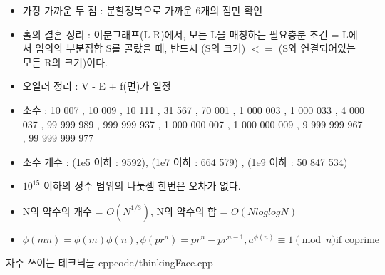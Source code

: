 \documentclass[landscape, 10pt, a4paper, oneside, twocolumn]{extarticle}
\begin{document}
\begin{itemize}
\item 가장 가까운 두 점 : 분할정복으로 가까운 6개의 점만 확인

\item 홀의 결혼 정리 : 이분그래프(L-R)에서, 모든 L을 매칭하는 필요충분 조건 = L에서 임의의 부분집합 S를 골랐을 때, 반드시 (S의 크기) $<=$ (S와 연결되어있는 모든 R의 크기)이다.

\item 오일러 정리 : V - E + f(면)가 일정

\item 소수 : 10 007 , 10 009 , 10 111 , 31 567 , 70 001 , 1 000 003 , 1 000 033 , 4 000 037 , 99 999 989 , 999 999 937 , 1 000 000 007 , 1 000 000 009 , 9 999 999 967 , 99 999 999 977

\item 소수 개수 : (1e5 이하 : 9592), (1e7 이하 : 664 579) , (1e9 이하 : 50 847 534) 

\item $10^{15}$ 이하의 정수 범위의 나눗셈 한번은 오차가 없다.

\item N의 약수의 개수 = $O(N^{1/3})$, N의 약수의 합 = $O(NloglogN)$

\item $\phi(mn) = \phi(m) \phi(n) , \phi(pr^n) = pr^n - pr^{n-1} , a^{\phi(n)} \equiv 1 \pmod{n} \text{if coprime}$

\end{itemize}

\Algorithm
{자주 쓰이는 테크닉들}
{}
{}
{cpp}{code/thinkingFace.cpp}
\end{document}
